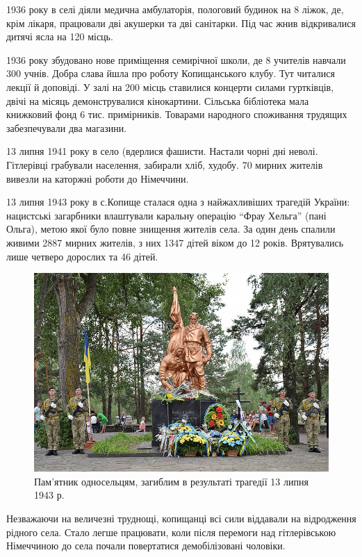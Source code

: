 1936 року в селі діяли медична амбулаторія, пологовий будинок на 8 ліжок, де, крім лікаря, працювали дві акушерки та дві санітарки. Під час жнив відкривалися дитячі ясла на 120 місць.

1936 року збудовано нове приміщення семирічної школи, де 8 учителів навчали 300 учнів. Добра слава йшла про роботу Копищанського клубу. Тут читалися лекції й доповіді. У залі на 200 місць ставилися концерти силами гуртківців, двічі на місяць демонструвалися кінокартини. Сільська бібліотека мала книжковий фонд 6 тис. примірників. Товарами народного споживання трудящих забезпечували два магазини.

13 липня 1941 року в село (вдерлися фашисти. Настали чорні дні неволі. Гітлерівці грабували населення, забирали хліб, худобу. 70 мирних жителів вивезли на каторжні роботи до Німеччини.

13 липня 1943 року в с.Копище сталася одна з найжахливіших трагедій України: нацистські загарбники влаштували каральну операцію “Фрау Хельга” (пані Ольга), метою якої було повне знищення жителів села. За один день спалили живими 2887 мирних жителів, з них 1347 дітей віком до 12 років. Врятувались лише четверо дорослих та 46 дітей.
\begin{figure}[h]
	
	\centering
	
	\includegraphics[width=0.8\linewidth]{0.jpg}
	
	\caption{Пам'ятник односельцям, загиблим в результаті трагедії 13 липня 1943 р.}
	
	\label{fig:mpr}
	
\end{figure}
Незважаючи на величезні труднощі, копищанці всі сили віддавали на відродження рідного села. Стало легше працювати, коли після перемоги над гітлерівською Німеччиною до села почали повертатися демобілізовані чоловіки.

